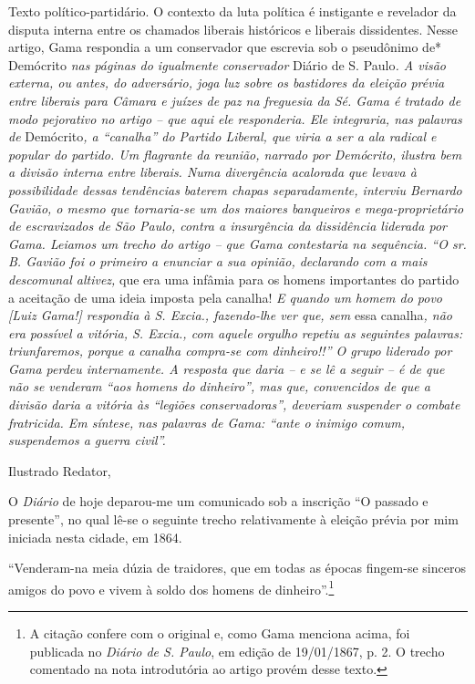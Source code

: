 \begin{didascalia}
Texto político-partidário. O contexto da luta política é instigante e
revelador da disputa interna entre os chamados liberais históricos e
liberais dissidentes. Nesse artigo, Gama respondia a um conservador que
escrevia sob o pseudônimo de* Demócrito \emph{nas páginas do igualmente
conservador} Diário de S. Paulo\emph{. A visão externa, ou antes, do
adversário, joga luz sobre os bastidores da eleição prévia entre
liberais para Câmara e juízes de paz na freguesia da Sé. Gama é tratado
de modo pejorativo no artigo -- que aqui ele responderia. Ele
integraria, nas palavras de} Demócrito\emph{, a ``canalha'' do Partido
Liberal, que viria a ser a ala radical e popular do partido. Um
flagrante da reunião, narrado por Demócrito, ilustra bem a divisão
interna entre liberais. Numa divergência acalorada que levava à
possibilidade dessas tendências baterem chapas separadamente, interviu
Bernardo Gavião, o mesmo que tornaria-se um dos maiores banqueiros e
mega-proprietário de escravizados de São Paulo, contra a insurgência da
dissidência liderada por Gama. Leiamos um trecho do artigo -- que Gama
contestaria na sequência. ``O sr. B. Gavião foi o primeiro a enunciar a
sua opinião, declarando com a mais descomunal altivez,} que era uma
infâmia para os homens importantes do partido a aceitação de uma ideia
imposta pela canalha! \emph{E quando um homem do povo {[}Luiz Gama!{]}
respondia à S. Excia., fazendo-lhe ver que, sem} essa canalha\emph{, não
era possível a vitória, S. Excia., com aquele orgulho repetiu as
seguintes palavras: triunfaremos, porque a canalha compra-se com
dinheiro!!'' O grupo liderado por Gama perdeu internamente. A resposta
que daria -- e se lê a seguir -- é de que não se venderam ``aos homens do
dinheiro'', mas que, convencidos de que a divisão daria a vitória às
``legiões conservadoras'', deveriam suspender o combate fratricida. Em
síntese, nas palavras de Gama: ``ante o inimigo comum, suspendemos a
guerra civil''.}
\end{didascalia}

\asterisc{}

Ilustrado Redator,

O \emph{Diário} de hoje deparou-me um comunicado sob a inscrição ``O
passado e presente'', no qual lê-se o seguinte trecho relativamente à
eleição prévia por mim iniciada nesta cidade, em 1864.

``Venderam-na meia dúzia de traidores, que em todas as épocas fingem-se
sinceros amigos do povo e vivem à soldo dos homens de
dinheiro''.\footnote{A citação confere com o original e, como Gama
  menciona acima, foi publicada no \emph{Diário de S. Paulo}, em edição
  de 19/01/1867, p. 2. O trecho comentado na nota introdutória ao artigo
  provém desse texto.}

